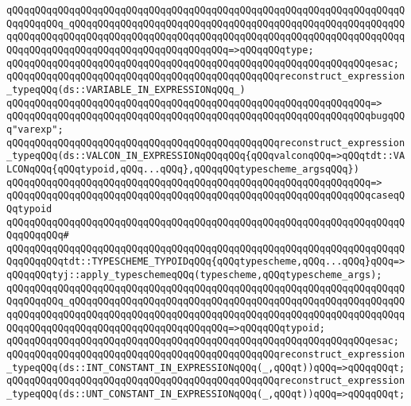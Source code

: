 \verb|qQQqqQQqqQQqqQQqqQQqqQQqqQQqqQQqqQQqqQQqqQQqqQQqqQQqqQQqqQQqqQQqqQQqqQQqqQQqqQQq_qQQqqQQqqQQqqQQqqQQqqQQqqQQqqQQqqQQqqQQqqQQqqQQqqQQqqQQqqQQqqQQqqQQqqQQqqQQqqQQqqQQqqQQqqQQqqQQqqQQqqQQqqQQqqQQqqQQqqQQqqQQqqQQqqQQqqQQqqQQqqQQqqQQqqQQqqQQqqQQqqQQqqQQq=>qQQqqQQqtype;|\newline
\verb|qQQqqQQqqQQqqQQqqQQqqQQqqQQqqQQqqQQqqQQqqQQqqQQqqQQqqQQqqQQqqQQqesac;|\newline
\newline
\verb|qQQqqQQqqQQqqQQqqQQqqQQqqQQqqQQqqQQqqQQqqQQqqQQqreconstruct_expression_typeqQQq(ds::VARIABLE_IN_EXPRESSIONqQQq_)|\newline
\verb|qQQqqQQqqQQqqQQqqQQqqQQqqQQqqQQqqQQqqQQqqQQqqQQqqQQqqQQqqQQqqQQq=>|\newline
\verb|qQQqqQQqqQQqqQQqqQQqqQQqqQQqqQQqqQQqqQQqqQQqqQQqqQQqqQQqqQQqqQQqbugqQQq"varexp";|\newline
\newline
\verb|qQQqqQQqqQQqqQQqqQQqqQQqqQQqqQQqqQQqqQQqqQQqqQQqreconstruct_expression_typeqQQq(ds::VALCON_IN_EXPRESSIONqQQqqQQq{qQQqvalconqQQq=>qQQqtdt::VALCONqQQq{qQQqtypoid,qQQq...qQQq},qQQqqQQqtypescheme_argsqQQq})|\newline
\verb|qQQqqQQqqQQqqQQqqQQqqQQqqQQqqQQqqQQqqQQqqQQqqQQqqQQqqQQqqQQqqQQq=>|\newline
\verb|qQQqqQQqqQQqqQQqqQQqqQQqqQQqqQQqqQQqqQQqqQQqqQQqqQQqqQQqqQQqqQQqcaseqQQqtypoid|\newline
\verb|qQQqqQQqqQQqqQQqqQQqqQQqqQQqqQQqqQQqqQQqqQQqqQQqqQQqqQQqqQQqqQQqqQQqqQQqqQQqqQQq#|\newline
\verb|qQQqqQQqqQQqqQQqqQQqqQQqqQQqqQQqqQQqqQQqqQQqqQQqqQQqqQQqqQQqqQQqqQQqqQQqqQQqqQQqtdt::TYPESCHEME_TYPOIDqQQq{qQQqtypescheme,qQQq...qQQq}qQQq=>qQQqqQQqtyj::apply_typeschemeqQQq(typescheme,qQQqtypescheme_args);|\newline
\verb|qQQqqQQqqQQqqQQqqQQqqQQqqQQqqQQqqQQqqQQqqQQqqQQqqQQqqQQqqQQqqQQqqQQqqQQqqQQqqQQq_qQQqqQQqqQQqqQQqqQQqqQQqqQQqqQQqqQQqqQQqqQQqqQQqqQQqqQQqqQQqqQQqqQQqqQQqqQQqqQQqqQQqqQQqqQQqqQQqqQQqqQQqqQQqqQQqqQQqqQQqqQQqqQQqqQQqqQQqqQQqqQQqqQQqqQQqqQQqqQQqqQQqqQQq=>qQQqqQQqtypoid;|\newline
\verb|qQQqqQQqqQQqqQQqqQQqqQQqqQQqqQQqqQQqqQQqqQQqqQQqqQQqqQQqqQQqqQQqesac;|\newline
\newline
\verb|qQQqqQQqqQQqqQQqqQQqqQQqqQQqqQQqqQQqqQQqqQQqqQQqreconstruct_expression_typeqQQq(ds::INT_CONSTANT_IN_EXPRESSIONqQQq(_,qQQqt))qQQq=>qQQqqQQqt;|\newline
\verb|qQQqqQQqqQQqqQQqqQQqqQQqqQQqqQQqqQQqqQQqqQQqqQQqreconstruct_expression_typeqQQq(ds::UNT_CONSTANT_IN_EXPRESSIONqQQq(_,qQQqt))qQQq=>qQQqqQQqt;|\newline
